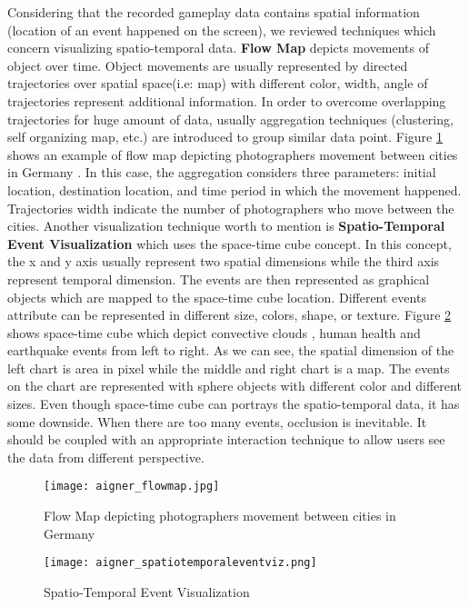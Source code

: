 Considering that the recorded gameplay data contains spatial information (location of an event happened on the screen), we reviewed techniques which concern visualizing spatio-temporal data. \textbf{Flow Map} depicts movements of object over time. Object movements are usually represented by directed trajectories over spatial space(i.e: map) with different color, width, angle of trajectories represent additional information. In order to overcome overlapping trajectories for huge amount of data, usually aggregation techniques (clustering, self organizing map, etc.) are introduced to group similar data point. Figure \ref{flow_map} shows an example of flow map depicting photographers movement between cities in Germany \cite{adrienko}. In this case, the aggregation considers three parameters: initial location, destination location, and time period in which the movement happened. Trajectories width indicate the number of photographers who move between the cities. Another visualization technique worth to mention is \textbf{Spatio-Temporal Event Visualization} which uses the space-time cube concept. In this concept, the x and y axis usually represent two spatial dimensions while the third axis represent temporal dimension. The events are then represented as graphical objects which are mapped to the space-time cube location. Different events attribute can be represented in different size, colors, shape, or texture. Figure \ref{spatio_temporal} shows space-time cube which depict convective clouds \cite{turdukulov}, human health \cite{tominski} and earthquake events \cite{gatalsky} from left to right. As we can see, the  spatial dimension of the left chart is area in pixel while the middle and right chart is a map. The events on the chart are represented with sphere objects with different color and different sizes. Even though space-time cube can portrays the spatio-temporal data, it has some downside. When there are too many events, occlusion is inevitable. It should be coupled with an appropriate interaction technique to allow users see the data from different perspective.

\begin{figure}
\centering
\texttt{[image: aigner\_flowmap.jpg]}
\caption{Flow Map depicting photographers movement between cities in Germany}
\label{flow_map}
\end{figure}

\begin{figure}
\centering
\texttt{[image: aigner\_spatiotemporaleventviz.png]}
\caption{Spatio-Temporal Event Visualization}
\label{spatio_temporal}
\end{figure}


